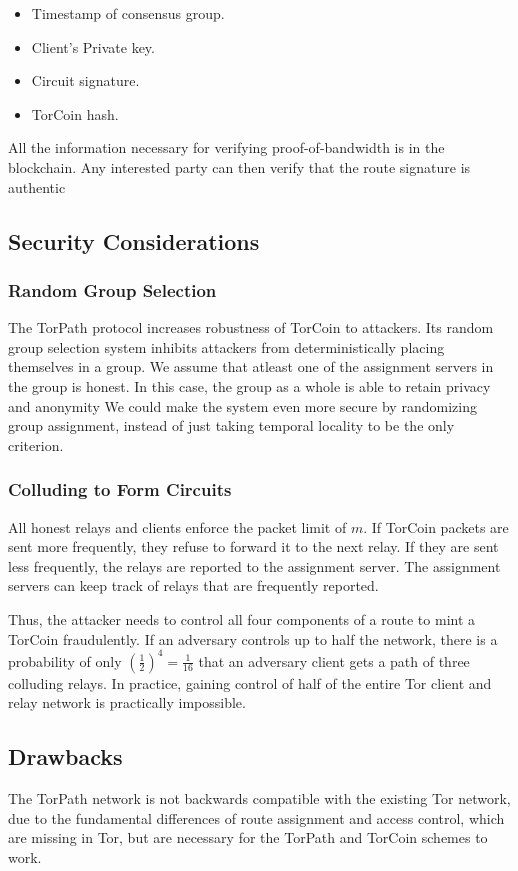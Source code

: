 \begin{itemize}
\item Timestamp of consensus group.
\item Client's Private key.
\item Circuit signature.
\item TorCoin hash.
\end{itemize}

All the information necessary for verifying proof-of-bandwidth is in the blockchain. 
Any interested party can then verify that the route signature is authentic 

\subsection{Security Considerations}

\subsubsection{Random Group Selection}
The TorPath protocol increases robustness of TorCoin to attackers. Its random group selection system inhibits attackers from deterministically placing themselves in a group.
We assume that atleast one of the assignment servers in the group is honest. In this case, the group as a whole is able to retain privacy and anonymity
We could make the system even more secure by randomizing group assignment, instead of just taking temporal locality to be the only criterion.

\subsubsection{Colluding to Form Circuits}
All honest relays and clients enforce the packet limit of $m$. If TorCoin packets 
are sent more frequently, they refuse to forward it to the next relay. If they are
sent less frequently, the relays are reported to the assignment server. The
assignment servers can keep track of relays that are frequently reported.

Thus, the attacker needs to control all four components of a route to mint a TorCoin fraudulently. If an adversary controls up to half the network, there is a probability of only $(\frac{1}{2})^4 = \frac{1}{16}$ that an adversary client gets a path of three colluding relays. In practice, gaining control of half of the entire Tor client and relay network is practically impossible. 

\subsection{Drawbacks}
The TorPath network is not backwards compatible with the existing Tor network, due to the fundamental differences of route assignment and access control, which are missing in Tor, but are necessary for the TorPath and TorCoin schemes to work.

